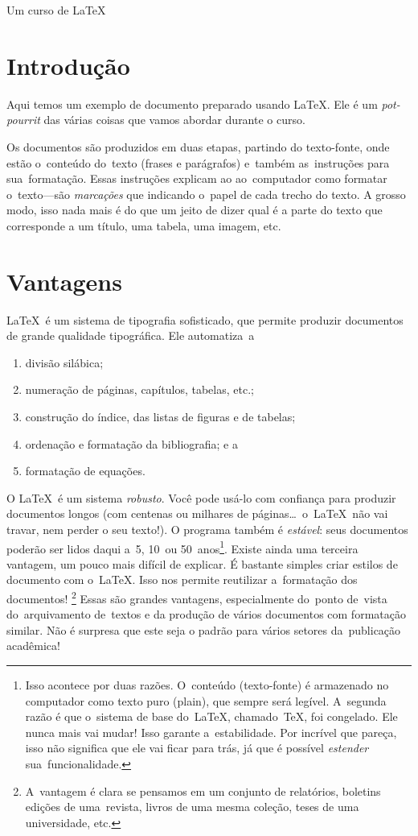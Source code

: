 \documentclass[a5paper,11pt,article,oneside]{memoir}
\let\velhoEmph\emph
\renewcommand{\emph}[1]{\textcolor{blue!80!black}{\velhoEmph{#1}}}
\begin{document}
\hfill{\HUGE Um curso de \color{red!80!black}\LaTeX}
\bigskip

\tableofcontents*

\hypersetup{linkcolor=red!90!black}

\bigskip

\chapter{Introdução}
Aqui temos um exemplo de documento preparado usando \LaTeX.
Ele é um \emph{pot-pourrit} das várias coisas que vamos abordar
durante o curso. 

Os documentos são produzidos em duas etapas, partindo do texto-fonte, 
onde estão o~conteúdo do~texto (frases e parágrafos) e~também 
as~instruções para sua~formatação.
Essas instruções explicam ao ao~computador como formatar o~texto---são
\emph{marcações} que indicando o~papel de cada trecho do texto. A grosso modo,
isso nada mais é do que um jeito de dizer qual é a parte do texto que 
corresponde a um título, uma tabela, uma imagem, etc.


\chapter{Vantagens}

\LaTeX\ é um sistema de tipografia sofisticado, que permite
produzir documentos de grande qualidade tipográfica.
Ele automatiza~a
\begin{enumerate}
\item divisão silábica;
\item numeração de páginas, capítulos, tabelas, etc.;
\item construção do índice, das listas de figuras e de tabelas;
\item ordenação e formatação da bibliografia; e a
\item formatação de equações.
\end{enumerate}
O \LaTeX\ é um sistema \emph{robusto}. Você pode usá-lo com
confiança para produzir documentos longos 
(com centenas ou milhares de páginas\ldots\ o~\LaTeX\ não vai travar,
 nem perder o seu texto!). 
O programa também é \emph{estável}: seus documentos poderão ser lidos 
daqui a~5, 
10~ou 50~anos\footnote{Isso acontece por duas razões. O~conteúdo (texto-fonte)
é armazenado no computador como texto puro (plain), que sempre será legível.
A~segunda razão é que o~sistema de base do~\LaTeX, 
chamado~\TeX, foi congelado. Ele nunca mais vai mudar! 
Isso garante a~estabilidade. Por incrível que pareça, isso não significa que ele
vai ficar para trás, já que é possível \emph{estender} 
sua~funcionalidade.}.
Existe ainda uma terceira vantagem, um pouco mais difícil de explicar.
É bastante simples criar estilos de documento com o~\LaTeX.
Isso nos permite reutilizar a~formatação dos documentos!%
\footnote{A~vantagem é clara se pensamos em um conjunto de relatórios, 
boletins edições de uma~revista, livros de uma mesma coleção, teses de uma 
universidade, etc.}
Essas são grandes vantagens, especialmente do~ponto de~vista 
do~arquivamento de~textos e da produção
de vários documentos com formatação similar. 
Não é surpresa que este seja o padrão para vários setores da~publicação
acadêmica!
\end{document}
